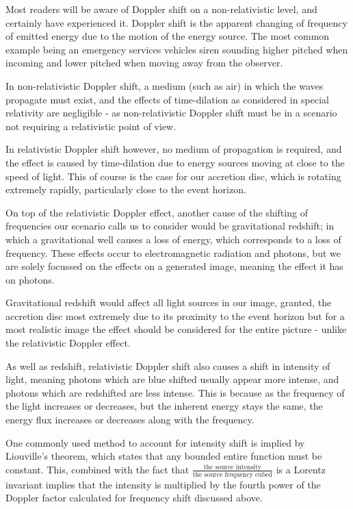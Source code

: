 \documentclass[oneside,openright,frontopenright, singlespacing]{dmathesis}
\begin{document}
	Most readers will be aware of Doppler shift on a non-relativistic level, and certainly have experienced it. Doppler shift is the apparent changing of frequency of emitted energy due to the motion of the energy source. The most common example being an emergency services vehicles siren sounding higher pitched when incoming and lower pitched when moving away from the observer.

\vspace{1em}
	In non-relativistic Doppler shift, a medium (such as air) in which the waves propagate must exist, and the effects of time-dilation as considered in special relativity are negligible - as non-relativistic Doppler shift must be in a scenario not requiring a relativistic point of view.

\vspace{1em}
	In relativistic Doppler shift however, no medium of propagation is required, and the effect is caused by time-dilation due to energy sources moving at close to the speed of light. This of course is the case for our accretion disc, which is rotating extremely rapidly, particularly close to the event horizon.

\vspace{1em}
	On top of the relativistic Doppler effect, another cause of the shifting of frequencies our scenario calls us to consider would be gravitational redshift; in which a gravitational well causes a loss of energy, which corresponds to a loss of frequency. These effects occur to electromagnetic radiation and photons, but we are solely focussed on the effects on a generated image, meaning the effect it has on photons.

\vspace{1em}
	Gravitational redshift would affect all light sources in our image, granted, the accretion disc most extremely due to its proximity to the event horizon but for a most realistic image the effect should be considered for the entire picture - unlike the relativistic Doppler effect.

\vspace{1em}
	As well as redshift, relativistic Doppler shift also causes a shift in intensity of light, meaning photons which are blue shifted usually appear more intense, and photons which are redshifted are less intense. This is because as the frequency of the light increases or decreases, but the inherent energy stays the same, the energy flux increases or decreases along with the frequency. 

\vspace{1em}
	One commonly used method to account for intensity shift is implied by Liouville's theorem, which states that any bounded entire function must be constant. This, combined with the fact that $\frac{\mbox{the source intensity}}{\mbox{the source frequency cubed}}$ is a Lorentz invariant implies that the intensity is multiplied by the fourth power of the Doppler factor calculated for frequency shift discussed above.
\end{document}
